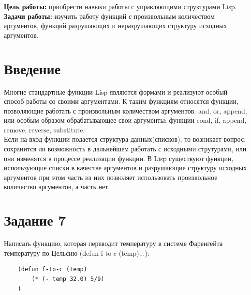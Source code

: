 \documentclass[a4paper, 12pt]{article}
\begin{document}
\tableofcontents
\clearpage
\newpage

\textbf{Цель работы:} приобрести навыки работы с управляющими структурами Lisp.
\\ \hspace*{5mm} \textbf{Задачи работы:} изучить работу функций с произвольным количеством аргументов, функций разрушающих и неразрушающих структуру исходных аргументов.


\section*{Введение}

\hspace*{5mm} Многие стандартные функции Lisp являются формами и реализуют особый способ работы со своими аргументами. К таким функциям относятся функции, позволяющие работать с произвольным количеством аргументов: and, or, append, или особым образом обрабатывающее свои аргументы: функции cond, if, append, remove, reverse, substitute.
\\ \hspace*{5mm} Если на вход функции подается структура данных(списков), то возникает вопрос: сохранится ли возможность в дальнейшем работать с исходными струтурами, или они изменятся в процессе реализации функции. В Lisp существуют функции, использующие списки в качестве аргументов и разрушающие структуру исходных аргументов при этом часть из них позволяет использовать произвольное количество аргументов, а часть нет.
\clearpage
\newpage




\lstset{style=mystyle}

\section*{Задание 7}
Написать функцию, которая переводит температуру в системе Фаренгейта температуру по Цельсию (defun f-to-c (temp)...):\\
\begin{lstlisting}
	(defun f-to-c (temp)
		(* (- temp 32.0) 5/9)
	)
\end{lstlisting}
\end{document}
